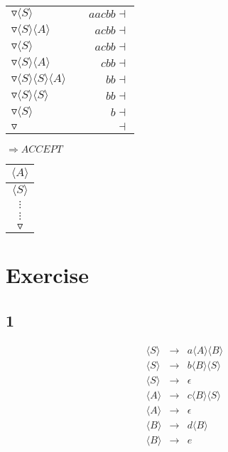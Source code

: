\documentclass[a4paper,12pt]{article}
\newcommand{\nonterminal}[1]{\langle #1 \rangle}
\begin{document}
\begin{tabular}{lcr}
$\triangledown \nonterminal{S}$	&	\hspace{10mm}	&	$aacbb\dashv$	\\
$\triangledown \nonterminal{S} \nonterminal{A}$	&	\hspace{10mm}	&	$acbb\dashv$	\\
$\triangledown \nonterminal{S}$	&	\hspace{10mm}	&	$acbb\dashv$	\\
$\triangledown \nonterminal{S} \nonterminal{A}$	&	\hspace{10mm}	&	$cbb\dashv$	\\
$\triangledown \nonterminal{S} \nonterminal{S}\nonterminal{A}$	&	\hspace{10mm}	&	$bb\dashv$	\\
$\triangledown \nonterminal{S} \nonterminal{S}$	&	\hspace{10mm}	&	$bb\dashv$	\\
$\triangledown \nonterminal{S}$	&	\hspace{10mm}	&	$b\dashv$	\\
$\triangledown $						&	\hspace{10mm}	&	$\dashv$	\\
\end{tabular}

$\Rightarrow ACCEPT$

\begin{tabular}{|c|}
		\\
\hline
\sout{$\nonterminal{A}$}	\\
\hline
$\nonterminal{S}$	\\
\hline
$\vdots$	\\
$\vdots$	\\
\hline
$\triangledown$	\\
\hline
\end{tabular}

\section*{Exercise}

\subsection*{1}

\begin{eqnarray}
\nonterminal{S}	&	\to	&	a \nonterminal{A} \nonterminal{B}	\\	
\nonterminal{S}	&	\to	&	b \nonterminal{B} \nonterminal{S}	\\	
\nonterminal{S}	&	\to	&	\epsilon										\\	
\nonterminal{A}	&	\to	&	c \nonterminal{B} \nonterminal{S}	\\	
\nonterminal{A}	&	\to	&	\epsilon										\\
\nonterminal{B}	&	\to	&	d \nonterminal{B}							\\	
\nonterminal{B}	&	\to	&	e 												\\	
\end{eqnarray}
\end{document}
